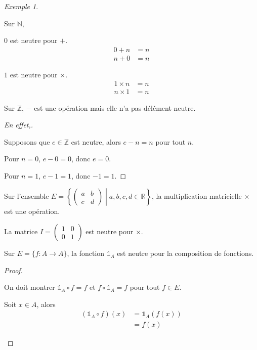 \documentclass{report}
\newcommand*{\reels}{\mathbb{R}}
\newcommand*{\entiers}{\mathbb{Z}}
\newcommand*{\naturels}{\mathbb{N}}
\theoremstyle{definition}
\theoremstyle{remark}
\newtheorem*{exem}{Exemple}
\begin{document}
	\begin{exem}~
		
		Sur $\naturels$,

		\begin{ulist}
			\item $0$ est neutre pour $+$.
			\begin{align*}
				0+n&=n\\
				n+0&=n
			\end{align*}
			\item $1$ est neutre pour $\times$.
			\begin{align*}
				1 \times n&=n\\
				n \times 1&=n
			\end{align*}
		\end{ulist}

		Sur $\entiers$, $-$ est une op\'eration mais elle n'a pas d\'el\'ement neutre.
		\renewcommand{\qedsymbol}{\lightning}
		\begin{proof}[En effet,]~

			Supposons que $e \in \entiers$ est neutre, alors $e-n=n$ pour tout $n$.

			Pour $n=0$, $e-0=0$, donc $e=0$.

			Pour $n=1$, $e-1=1$, donc $-1=1$.
		\end{proof}
		\renewcommand{\qedsymbol}{$\square$}
		\begin{ulist}
			\item Sur l'ensemble $E=\left\lbrace \left( \begin{array}{cc}
				a&b\\c&d
			\end{array}\right) \middle| a,b,c,d \in \reels\right\rbrace$, la multiplication matricielle $\times$ est une op\'eration.

			La matrice $I=\left( \begin{array}{cc}
				1&0\\0&1
			\end{array}\right)$ est neutre pour $\times$.
			\item Sur $E=\{f:A \to A\}$, la fonction $\mathds{1}_A$ est neutre pour la composition de fonctions.
			\begin{proof}~

				On doit montrer $\mathds{1}_A \circ f=f$ et $f \circ \mathds{1}_A=f$ pour tout $f \in E$.
				\begin{nlist}
					\item Soit $x \in A$, alors
					\begin{align*}
						(\mathds{1}_A \circ f)(x)&= \mathds{1}_A(f(x))\\
						&= f(x)
					\end{align*}


\end{nlist}
\end{proof}
\end{ulist}
\end{exem}
\end{document}

